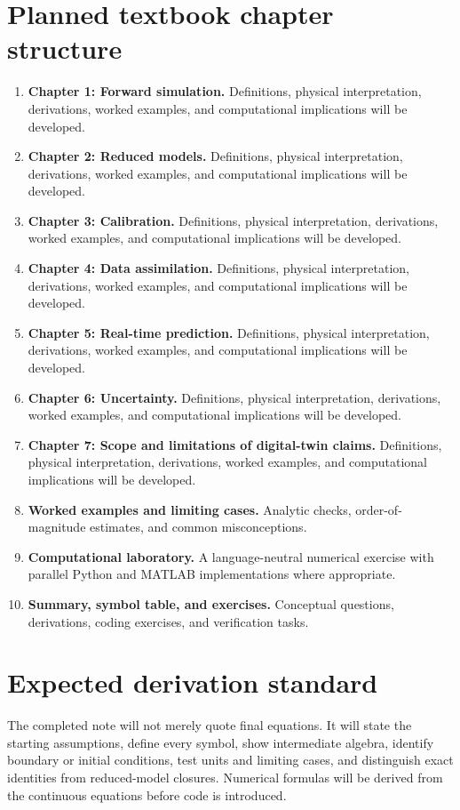 \documentclass[11pt]{article}
\begin{document}
\section{Planned textbook chapter structure}
\begin{enumerate}[leftmargin=1.8em]
\item \textbf{Chapter 1: Forward simulation.} Definitions, physical interpretation, derivations, worked examples, and computational implications will be developed.
\item \textbf{Chapter 2: Reduced models.} Definitions, physical interpretation, derivations, worked examples, and computational implications will be developed.
\item \textbf{Chapter 3: Calibration.} Definitions, physical interpretation, derivations, worked examples, and computational implications will be developed.
\item \textbf{Chapter 4: Data assimilation.} Definitions, physical interpretation, derivations, worked examples, and computational implications will be developed.
\item \textbf{Chapter 5: Real-time prediction.} Definitions, physical interpretation, derivations, worked examples, and computational implications will be developed.
\item \textbf{Chapter 6: Uncertainty.} Definitions, physical interpretation, derivations, worked examples, and computational implications will be developed.
\item \textbf{Chapter 7: Scope and limitations of digital-twin claims.} Definitions, physical interpretation, derivations, worked examples, and computational implications will be developed.
\item \textbf{Worked examples and limiting cases.} Analytic checks, order-of-magnitude estimates, and common misconceptions.
\item \textbf{Computational laboratory.} A language-neutral numerical exercise with parallel Python and MATLAB implementations where appropriate.
\item \textbf{Summary, symbol table, and exercises.} Conceptual questions, derivations, coding exercises, and verification tasks.
\end{enumerate}

\section{Expected derivation standard}
The completed note will not merely quote final equations. It will state the starting assumptions, define every symbol, show intermediate algebra, identify boundary or initial conditions, test units and limiting cases, and distinguish exact identities from reduced-model closures. Numerical formulas will be derived from the continuous equations before code is introduced.
\end{document}
